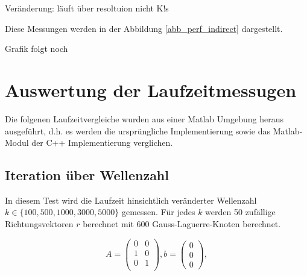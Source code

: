 Veränderung: läuft über resoltuion nicht K!s

Diese Messungen werden in der Abbildung \ref{abb_perf_indirect} dargestellt.

\begin{center}
  
\end{center}

Grafik folgt noch

\section{Auswertung der Laufzeitmessugen}

Die folgenen Laufzeitvergleiche wurden aus einer Matlab Umgebung heraus ausgeführt, d.h. es werden die ursprüngliche Implementierung sowie das Matlab-Modul der C++ Implementierung verglichen.


\subsection{Iteration über Wellenzahl}


In diesem Test wird die Laufzeit hinsichtlich veränderter Wellenzahl $k \in \{ 100, 500, 1000, 3000, 5000 \}$ gemessen.
Für jedes $k$ werden 50 zufällige Richtungsvektoren $r$ berechnet mit 600 Gauss-Laguerre-Knoten berechnet.

\begin{equation}
  A = \begin{pmatrix}
      0 & 0 \\
      1 & 0 \\
      0 & 1 \\
  \end{pmatrix}, b = \begin{pmatrix}
      0 \\ 0\\ 0
  \end{pmatrix},
\end{equation}

